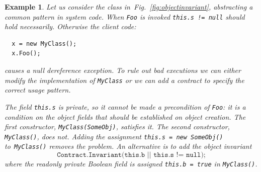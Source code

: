 \documentclass[10pt]{sigplanconf}
\newtheorem{example}{Example}
\newcommand{\refFig}[1]{Fig.~\ref{fig:#1}}
\newcommand{\code}[1]{\texttt{#1}}
\begin{document}
\begin{example}\normalfont
Let us consider the class in~\refFig{objectinvariant}, abstracting a common pattern in system code. 
When \code{Foo} is invoked \code{this.s != null} should hold necessarily.
Otherwise the client code:
\begin{lstlisting}
  x = new MyClass();
  x.Foo();
\end{lstlisting}
causes a null dereference exception.
To rule out bad executions we can either modify the implementation of \code{MyClass} or we can add a contract to specify the correct usage pattern.

The field \code{this.s} is private, so it cannot be made a precondition of \code{Foo}: it is a condition on the object fields that should be established on object creation.
The first constructor, \code{MyClass(SomeObj)}, satisfies it.
The second constructor, \code{MyClass()}, does not.
Adding the assignment \code{this.s = new SomeObj()} to~\code{MyClass()} removes the problem.
An alternative is to add  the object invariant
\[
\code{Contract.Invariant(this.b || this.s != null);}
\]
where the readonly private Boolean field is assigned \code{this.b = true} in \code{MyClass()}.
\end{example}
\end{document}

